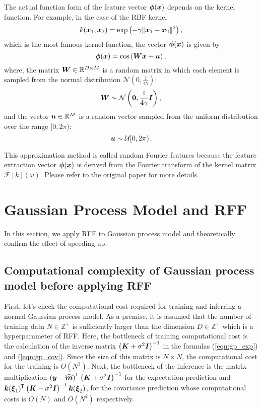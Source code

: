 \documentclass[twocolumn,a4paper,10pt]{article}
\begin{document}
The actual function form of the feature vector $\boldsymbol{\phi}(\boldsymbol{x})$ depends on the kernel function.
For example, in the case of the RBF kernel
\begin{equation}
    k (\boldsymbol{x}_1, \boldsymbol{x}_2) = \exp \left (- \gamma \| \boldsymbol{x}_1 - \boldsymbol{x}_2 \|^2 \right),
\end{equation}
which is the most famous kernel function, the vector $\boldsymbol{\phi} (\boldsymbol{x})$ is given by
\begin{equation}
    \boldsymbol{\phi} (\boldsymbol{x}) = \cos \left( \boldsymbol{Wx} + \boldsymbol{u} \right),
\end{equation}
where, the matrix $\boldsymbol{W} \in \mathbb{R}^{D \times M} $ is a random matrix in which each element
is sampled from the normal distribution $\mathcal{N} (0, \frac{1}{4 \gamma})$:
\begin{equation}
    \boldsymbol{W} \sim \mathcal{N} \left( \boldsymbol{0}, \frac{1}{4 \gamma} \boldsymbol{I} \right),
\end{equation}
and the vector $\boldsymbol{u} \in \mathbb{R}^M$ is a random vector sampled from the 
uniform distribution over the range $[0, 2 \pi)$:
\begin{equation}
    \boldsymbol{u} \sim \mathcal{U} [0, 2 \pi).
\end{equation}

This approximation method is called random Fourier features because the 
feature extraction vector $\boldsymbol{\phi}(\boldsymbol{x})$ is derived from the Fourier 
transform of the kernel matrix $\mathcal{F}[k](\omega)$.
Please refer to the original paper \cite{Rahimi2007} for more details.


\section{Gaussian Process Model and RFF}\titlebar

In this section, we apply RFF to Gaussian process model
and theoretically confirm the effect of speeding up.

\subsection{Computational complexity of Gaussian process model before applying RFF}

First, let's check the computational cost required for training and inferring a normal Gaussian
process model. As a premise, it is assumed that the number of training data $N \in \mathbb{Z}^{+}$
is sufficiently larger than the dimension $D \in \mathbb{Z}^{+}$ which is a hyperparameter of RFF.
Here, the bottleneck of training computational cost is the calculation of the inverse matrix
$\left (\boldsymbol{K} + \sigma^2 \boldsymbol{I} \right)^{-1}$ in the formulas (\ref{eqn:gp_exp}) and (\ref{eqn:gp_cov}).
Since the size of this matrix is $N \times N$, the computational cost for the training is $O(N^3)$.
Next, the bottleneck of the inference is the matrix multiplication
$\left (\boldsymbol{y} -\widehat{\boldsymbol{m}} \right)^{\mkern-1.5mu\mathsf{T}}\hspace{0.5pt} \left( \boldsymbol{K} + \sigma^2 \boldsymbol{I} \right)^{-1}$
for the expectation prediction and
$\boldsymbol{k} (\boldsymbol{\xi}_1)^{\mkern-1.5mu\mathsf{T}}\hspace{0.5pt} \left( \boldsymbol{K} - \sigma^2 \boldsymbol{I} \right)^{-1} \boldsymbol{k} (\boldsymbol{\xi}_2)$,
for the covariance prediction whose computational costs is $O(N)$ and $O(N^2)$ respectively.
\end{document}
